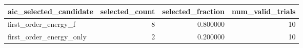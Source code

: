 \begin{tabular}{lrrr}
\toprule
aic_selected_candidate & selected_count & selected_fraction & num_valid_trials \\
\midrule
first_order_energy_f & 8 & 0.800000 & 10 \\
first_order_energy_only & 2 & 0.200000 & 10 \\
\bottomrule
\end{tabular}
